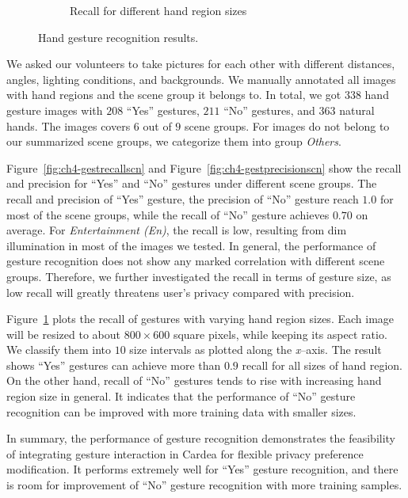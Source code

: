\begin{figure}[!htbp]
{{\begin{subfigure}[b]{0.4\textwidth}
        \caption{Recall for different hand region sizes}
        \label{fig:ch4-gestrecallsize}
      \end{subfigure}
    }
  }
\caption{Hand gesture recognition results.}
\label{fig:ch4-gesteval}
\end{figure}

We asked our volunteers to take pictures for each other with different distances, angles, lighting conditions, and backgrounds. We manually annotated all images with hand regions and the scene group it belongs to. In total, we got $338$ hand gesture images with $208$ ``Yes'' gestures, $211$ ``No'' gestures, and $363$ natural hands. The images covers $6$ out of $9$ scene groups. For images do not belong to our summarized scene groups, we categorize them into group \textit{Others}.

Figure~\ref{fig:ch4-gestrecallscn} and Figure~\ref{fig:ch4-gestprecisionscn} show the recall and precision for ``Yes'' and ``No'' gestures under different scene groups. The recall and precision of ``Yes'' gesture, the precision of ``No'' gesture reach $1.0$ for most of the scene groups, while the recall of ``No'' gesture achieves $0.70$ on average. For \textit{Entertainment (En)}, the recall is low, resulting from dim illumination in most of the images we tested. In general, the performance of gesture recognition does not show any marked correlation with different scene groups. Therefore, we further investigated the recall in terms of gesture size, as low recall will greatly threatens user's privacy compared with precision.

Figure~\ref{fig:ch4-gestrecallsize} plots the recall of gestures with varying hand region sizes. Each image will be resized to about $800 \times 600$ square pixels, while keeping its aspect ratio. We classify them into $10$ size intervals as plotted along the \textit{x}--axis. The result shows ``Yes'' gestures can achieve more than $0.9$ recall for all sizes of hand region. On the other hand, recall of ``No'' gestures tends to rise with increasing hand region size in general. It indicates that the performance of ``No'' gesture recognition can be improved with more training data with smaller sizes.

In summary, the performance of gesture recognition demonstrates the feasibility of integrating gesture interaction in Cardea for flexible privacy preference modification. It performs extremely well for ``Yes'' gesture recognition, and there is room for improvement of ``No'' gesture recognition with more training samples.


